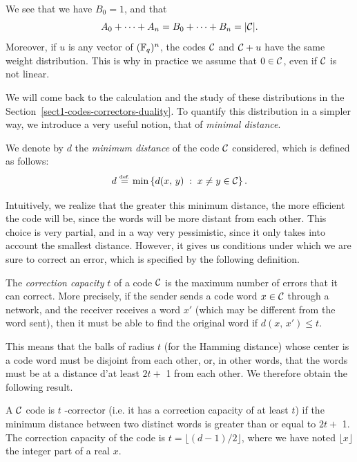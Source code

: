  
\begin{rem}
We see that we have $ B_0 = 1 $, and that
\begin{equation*}
A_0 + \cdots + A_n = B_0 + \cdots + B_n = | \mathcal{C} |.
\end{equation*}
Moreover, if $ u $ is any vector of $ (\mathbb{F}_q)^n $, the codes $ \mathcal{C} $ and $ \mathcal{C} + u $ have the same weight distribution. This is why in practice we assume that $ 0 \in \mathcal{C} $, even if $ \mathcal{C} $ is not linear.
\end{rem}
We will come back to the calculation and the study of these distributions in the Section~\ref{sect1-codes-correctors-duality}. To quantify this distribution in a simpler way, we introduce a very useful notion, that of \textit{minimal distance}.
 
\begin{defn}
 We denote by $ d $ the \textit{minimum distance} of the code $ \mathcal{C} $ considered, which is defined as follows:
\begin{equation*}
d \stackrel{\mbox{\upshape\tiny def.}}{=} \min \left\{ d (x, \, y) \;:\; x \neq y \in \mathcal{C} \right\}.
\end{equation*}
\end{defn}
Intuitively, we realize that the greater this minimum distance, the more efficient the code will be, since the words will be more distant from each other. This choice is very partial, and in a way very pessimistic, since it only takes into account the smallest distance. However, it gives us conditions under which we are sure to correct an error, which is specified by the following definition.
 
\begin{defn}
 The \textit{correction capacity} $ t $ of a code $ \mathcal{C} $ is the maximum number of errors that it can correct. More precisely, if the sender sends a code word $ x \in \mathcal{C} $ through a network, and the receiver receives a word $ x'$ (which may be different from the word sent), then it must be able to find the original word if $ d (x, \, x') \leq t $.
\end{defn}
This means that the balls of radius $ t $ (for the Hamming distance) whose center is a code word must be disjoint from each other, or, in other words, that the words must be at a distance d'at least $ 2 t + $ 1 from each other. We therefore obtain the following result.
 
\begin{prop}
A $ \mathcal{C} $ code is $ t $ -corrector (i.e. it has a correction capacity of at least $ t $) if the minimum distance between two distinct words is greater than or equal to $ 2 t + $ 1. The correction capacity of the code is $ t = \lfloor (d-1) / 2 \rfloor $, where we have noted $ \lfloor x \rfloor $ the integer part of a real $ x $.
\end{prop}
 
